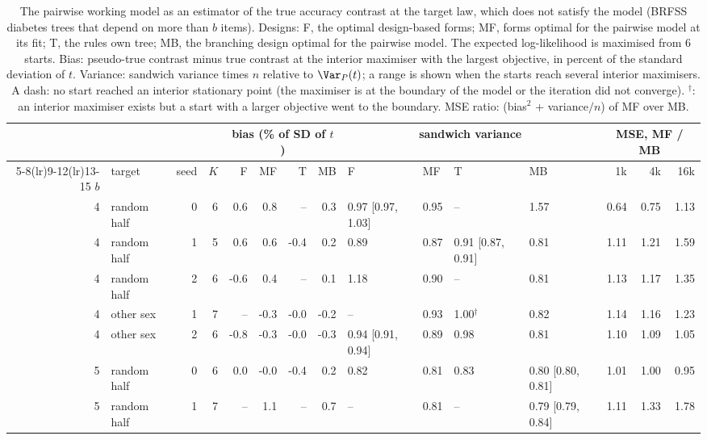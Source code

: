 \begin{table}[h]
\centering
\caption{The pairwise working model as an estimator of the true accuracy contrast at the target law, which does not satisfy the model (BRFSS diabetes trees that depend on more than $b$ items). Designs: F, the optimal design-based forms; MF, forms optimal for the pairwise model at its fit; T, the rule\textquotesingle s own tree; MB, the branching design optimal for the pairwise model. The expected log-likelihood is maximised from 6 starts. Bias: pseudo-true contrast minus true contrast at the interior maximiser with the largest objective, in percent of the standard deviation of $t$. Variance: sandwich variance times $n$ relative to $\Var_P(t)$; a range is shown when the starts reach several interior maximisers. A dash: no start reached an interior stationary point (the maximiser is at the boundary of the model or the iteration did not converge). $^\dagger$: an interior maximiser exists but a start with a larger objective went to the boundary. MSE ratio: (bias$^2$ + variance$/n$) of MF over MB.}
\label{tab:misspec}
\scriptsize
\setlength{\tabcolsep}{3pt}
\begin{tabular}{rlrr rrrr llll rrr}
\toprule
 & & & & \multicolumn{4}{c}{bias (\% of SD of $t$)} & \multicolumn{4}{c}{sandwich variance} & \multicolumn{3}{c}{MSE, MF / MB} \\
\cmidrule(lr){5-8}\cmidrule(lr){9-12}\cmidrule(lr){13-15}
$b$ & target & seed & $K$ & F & MF & T & MB & F & MF & T & MB & 1k & 4k & 16k \\
\midrule
4 & random half & 0 & 6 & 0.6 & 0.8 & -- & 0.3 & 0.97 [0.97, 1.03] & 0.95 & -- & 1.57 & 0.64 & 0.75 & 1.13 \\
4 & random half & 1 & 5 & 0.6 & 0.6 & -0.4 & 0.2 & 0.89 & 0.87 & 0.91 [0.87, 0.91] & 0.81 & 1.11 & 1.21 & 1.59 \\
4 & random half & 2 & 6 & -0.6 & 0.4 & -- & 0.1 & 1.18 & 0.90 & -- & 0.81 & 1.13 & 1.17 & 1.35 \\
4 & other sex & 1 & 7 & -- & -0.3 & -0.0 & -0.2 & -- & 0.93 & 1.00$^\dagger$ & 0.82 & 1.14 & 1.16 & 1.23 \\
4 & other sex & 2 & 6 & -0.8 & -0.3 & -0.0 & -0.3 & 0.94 [0.91, 0.94] & 0.89 & 0.98 & 0.81 & 1.10 & 1.09 & 1.05 \\
5 & random half & 0 & 6 & 0.0 & -0.0 & -0.4 & 0.2 & 0.82 & 0.81 & 0.83 & 0.80 [0.80, 0.81] & 1.01 & 1.00 & 0.95 \\
5 & random half & 1 & 7 & -- & 1.1 & -- & 0.7 & -- & 0.81 & -- & 0.79 [0.79, 0.84] & 1.11 & 1.33 & 1.78 \\

\end{tabular}
\end{table}
